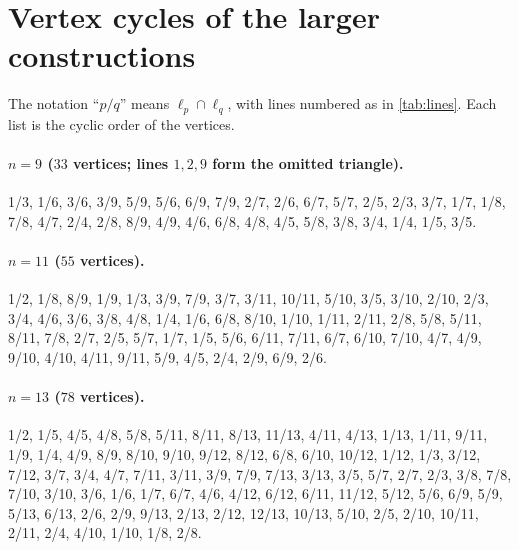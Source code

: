 \section{Vertex cycles of the larger constructions}\label{app:cycles}

The notation ``$p/q$'' means $\ell_p\cap\ell_q$, with lines numbered as in \cref{tab:lines}. Each list is
the cyclic order of the vertices.

\paragraph{$n=9$ ($33$ vertices; lines $1,2,9$ form the omitted triangle).}
{\small 1/3, 1/6, 3/6, 3/9, 5/9, 5/6, 6/9, 7/9, 2/7, 2/6, 6/7, 5/7, 2/5, 2/3, 3/7, 1/7, 1/8, 7/8, 4/7,
2/4, 2/8, 8/9, 4/9, 4/6, 6/8, 4/8, 4/5, 5/8, 3/8, 3/4, 1/4, 1/5, 3/5.}

\paragraph{$n=11$ ($55$ vertices).}
{\small 1/2, 1/8, 8/9, 1/9, 1/3, 3/9, 7/9, 3/7, 3/11, 10/11, 5/10, 3/5, 3/10, 2/10, 2/3, 3/4, 4/6, 3/6,
3/8, 4/8, 1/4, 1/6, 6/8, 8/10, 1/10, 1/11, 2/11, 2/8, 5/8, 5/11, 8/11, 7/8, 2/7, 2/5, 5/7, 1/7, 1/5,
5/6, 6/11, 7/11, 6/7, 6/10, 7/10, 4/7, 4/9, 9/10, 4/10, 4/11, 9/11, 5/9, 4/5, 2/4, 2/9, 6/9, 2/6.}

\paragraph{$n=13$ ($78$ vertices).}
{\small 1/2, 1/5, 4/5, 4/8, 5/8, 5/11, 8/11, 8/13, 11/13, 4/11, 4/13, 1/13, 1/11, 9/11, 1/9, 1/4, 4/9,
8/9, 8/10, 9/10, 9/12, 8/12, 6/8, 6/10, 10/12, 1/12, 1/3, 3/12, 7/12, 3/7, 3/4, 4/7, 7/11, 3/11, 3/9,
7/9, 7/13, 3/13, 3/5, 5/7, 2/7, 2/3, 3/8, 7/8, 7/10, 3/10, 3/6, 1/6, 1/7, 6/7, 4/6, 4/12, 6/12, 6/11,
11/12, 5/12, 5/6, 6/9, 5/9, 5/13, 6/13, 2/6, 2/9, 9/13, 2/13, 2/12, 12/13, 10/13, 5/10, 2/5, 2/10,
10/11, 2/11, 2/4, 4/10, 1/10, 1/8, 2/8.}
